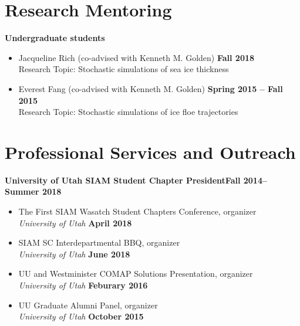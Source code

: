 \documentclass[margin,line]{res}
\begin{document}
\begin{resume}
\section{\sc Research Mentoring}
{\bf Undergraduate students}
\begin{itemize}
\item[ ] Jacqueline Rich (co-advised with Kenneth M. Golden) 
\hfill {\bf Fall 2018} \\
Research Topic: Stochastic simulations of sea ice thickness
\item[ ] Everest Fang (co-advised with Kenneth M. Golden)
\hfill {\bf Spring 2015 -- Fall 2015}\\
Research Topic: Stochastic simulations of ice floe trajectories
\end{itemize}

\section{\sc Professional Services and Outreach}

{\bf University of Utah SIAM Student Chapter President}\hfill{\bf Fall 2014--Summer 2018}
\begin{itemize}
\item[ ] The First SIAM Wasatch Student Chapters Conference, organizer
\\ {\it University of Utah} \hfill {\bf April 2018}
\item[ ] SIAM SC Interdepartmental BBQ, organizer
\\ {\it University of Utah} \hfill {\bf June 2018}
\item[ ] UU and Westminister COMAP Solutions Presentation, organizer
\\ {\it University of Utah} \hfill {\bf Feburary 2016}
\item[ ] UU Graduate Alumni Panel, organizer 
\\ {\it University of Utah} \hfill {\bf October 2015}
\end{itemize}


\end{resume}
\end{document}
